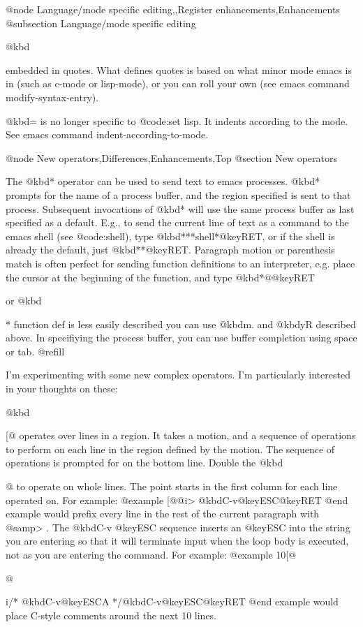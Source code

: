 {@node Language/mode specific editing,,Register enhancements,Enhancements
@subsection Language/mode specific editing

@kbd{%
embedded in quotes.  What defines quotes is based on what minor mode
emacs is in (such as c-mode or lisp-mode), or you can roll your own (see
emacs command modify-syntax-entry).

@kbd{=} is no longer specific to @code{:set lisp}.  It indents according to the
mode.  See emacs command indent-according-to-mode.

@node New operators,Differences,Enhancements,Top
@section New operators

The @kbd{*} operator can be used to send text to emacs processes.  @kbd{*}
prompts for the name of a process buffer, and the region specified is
sent to that process.  Subsequent invocations of @kbd{*} will use the same
process buffer as last specified as a default.  E.g., to send the
current line of text as a command to the emacs shell (see @code{:shell}),
type @kbd{***shell*@key{RET}}, or if the shell is already the default, just
@kbd{**@key{RET}}.  Paragraph motion or parenthesis match is often perfect for
sending function definitions to an interpreter, e.g. place the cursor at
the beginning of the function,
and type @kbd{*@}@key{RET}} or @kbd{*%
function def is less easily described you can use @kbd{m.} and @kbd{yR}
described above.  In specifiying the process buffer, you can use buffer
completion using space or tab. @refill

I'm experimenting with some new complex operators.  I'm particularly
interested in your thoughts on these:

@kbd{[@{} operates over lines in a region.  It takes a motion, and a sequence
of operations to perform on each line in the region defined by the
motion.  The sequence of operations is prompted for on the bottom line.
Double the @kbd{@{} to operate on whole lines.  The point starts in the first
column for each line operated on.  For example:
@example
[@{@}i> @kbd{C-v}@key{ESC}@key{RET}
@end example
would prefix every line in the rest of the current paragraph with @samp{> }.
The @kbd{C-v @key{ESC}} sequence inserts an @key{ESC} into the string you are
entering so that it will terminate input when the loop body is executed,
not as you are entering the command.  For example:
@example
10[@{@{i/* @kbd{C-v}@key{ESC}A */@kbd{C-v}@key{ESC}@key{RET}
@end example
would place C-style comments around the next 10 lines.

}}}}}}
